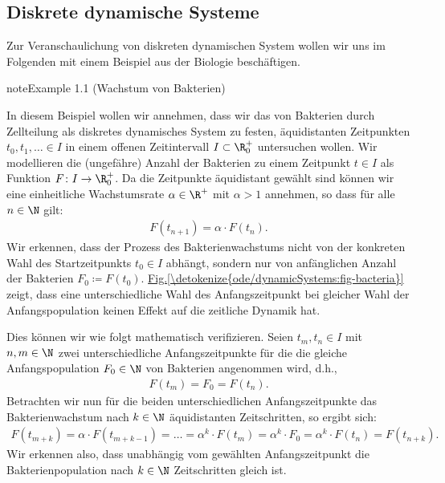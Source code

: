 \documentclass[letterpaper,10pt,english]{jupyterBook}
\begin{document}
\subsection{Diskrete dynamische Systeme}
\label{\detokenize{ode/dynamicSystems:diskrete-dynamische-systeme}}
Zur Veranschaulichung von diskreten dynamischen System wollen wir uns im Folgenden mit einem Beispiel aus der Biologie beschäftigen.
\label{ode/dynamicSystems:ex:bacteria}
\begin{sphinxadmonition}{note}{Example 1.1 (Wachstum von Bakterien)}



In diesem Beispiel wollen wir annehmen, dass wir das  von Bakterien durch Zellteilung als diskretes dynamisches System zu festen, äquidistanten Zeitpunkten \(t_0, t_1, \ldots \in I\) in einem offenen Zeitintervall \(I\subset\R^+_0\) untersuchen wollen.
Wir modellieren die (ungefähre) Anzahl der Bakterien zu einem Zeitpunkt \(t \in I\) als Funktion \(F \colon I \rightarrow \R_0^+\).
Da die Zeitpunkte äquidistant gewählt sind können wir eine einheitliche Wachstumsrate \(\alpha \in \R^+\) mit \(\alpha > 1\) annehmen, so dass für alle \(n \in \N\) gilt:
\begin{equation*}
\begin{split}F(t_{n+1}) = \alpha \cdot F(t_n).\end{split}
\end{equation*}
Wir erkennen, dass der Prozess des Bakterienwachstums nicht von der konkreten Wahl des Startzeitpunkts \(t_0 \in I\) abhängt, sondern nur von anfänglichen Anzahl der Bakterien \(F_0 \coloneqq F(t_0)\). \hyperref[\detokenize{ode/dynamicSystems:fig-bacteria}]{Fig.\@ \ref{\detokenize{ode/dynamicSystems:fig-bacteria}}} zeigt, dass eine unterschiedliche Wahl des Anfangszeitpunkt bei gleicher Wahl der Anfangspopulation keinen Effekt auf die zeitliche Dynamik hat.

Dies können wir wie folgt mathematisch verifizieren. Seien \(t_m, t_n \in I\) mit \(n,m \in \N\) zwei unterschiedliche Anfangszeitpunkte für die die gleiche Anfangspopulation \(F_0 \in \N\) von Bakterien angenommen wird, d.h.,
\begin{equation*}
\begin{split}F(t_m) = F_0 = F(t_n).\end{split}
\end{equation*}
Betrachten wir nun für die beiden unterschiedlichen Anfangszeitpunkte das Bakterienwachstum nach \(k \in \N\) äquidistanten Zeitschritten, so ergibt sich:
\begin{equation*}
\begin{split}F(t_{m+k}) = \alpha \cdot F(t_{m+k-1}) = \ldots = \alpha^k \cdot F(t_{m}) = \alpha^k \cdot F_0 = \alpha^k \cdot F(t_n) = F(t_{n+k}).\end{split}
\end{equation*}
Wir erkennen also, dass unabhängig vom gewählten Anfangszeitpunkt die Bakterienpopulation nach \(k \in \N\) Zeitschritten gleich ist.
\end{sphinxadmonition}
\end{document}
